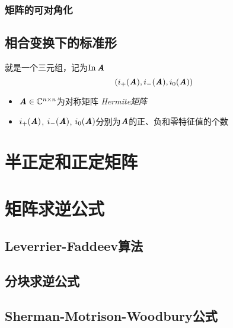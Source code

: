\subsubsection{矩阵的可对角化}
\label{ssub:ju_zhen_de_ke_dui_jiao_hua_}

\begin{definition}
\end{definition}

\subsection{相合变换下的标准形}
\label{sub:相合变换下的标准形}

\begin{definition}[$\MA$的惯性]
    就是一个三元组，记为$\mathrm{In}\, \boldsymbol{\mathit{A}}$
    \[
        (i_{+}(\boldsymbol{\mathit{A}}), i_{-}(\boldsymbol{\mathit{A}}), i_{0}(\boldsymbol{\mathit{A}}))
    \]
\begin{itemize}
    \item $\boldsymbol{\mathit{A}} \in \mathbb{C}^{n \times n}$为对称矩阵 \emph{ Hermite矩阵 }
    \item $i_{+}(\boldsymbol{\mathit{A}})$, $i_{-}(\boldsymbol{\mathit{A}})$, $i_{0}(\boldsymbol{\mathit{A}})$分别为$\MA$的正、负和零特征值的个数
\end{itemize}
\end{definition}

\section{半正定和正定矩阵}
\label{sec:半正定和正定矩阵}

\section{矩阵求逆公式}
\label{sec:矩阵求逆公式}

\subsection{Leverrier-Faddeev算法}
\label{sub:Leverrier-Faddeev算法}

\subsection{分块求逆公式}
\label{sub:分块求逆公式}

\subsection{Sherman-Motrison-Woodbury公式}
\label{sub:Sherman-Motrison-Woodbury公式}

